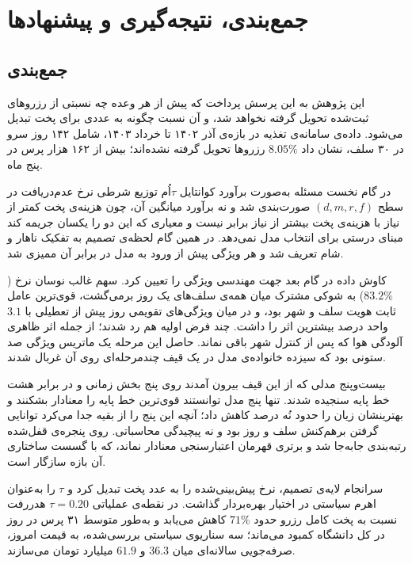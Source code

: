 \chapter{جمع‌بندی، نتیجه‌گیری و پیشنهادها}

\section{جمع‌بندی}
\label{sec:5-1}

این پژوهش به این پرسش پرداخت که پیش از هر وعده چه نسبتی از رزروهای ثبت‌شده تحویل گرفته
نخواهد شد، و آن نسبت چگونه به عددی برای پخت تبدیل می‌شود. داده‌ی سامانه‌ی تغذیه در بازه‌ی
آذر ۱۴۰۲ تا خرداد ۱۴۰۳، شامل ۱۴۲ روز سرو در ۳۰ سلف، نشان داد $8.05\%$ رزروها تحویل
گرفته نشده‌اند؛ بیش از ۱۶۲ هزار پرس در پنج ماه.

در گام نخست مسئله به‌صورت برآورد کوانتایل $\tau$اُم توزیع شرطی نرخ عدم‌دریافت در سطح
$(d,m,r,f)$ صورت‌بندی شد و نه برآورد میانگین آن، چون هزینه‌ی پخت کمتر از نیاز با هزینه‌ی
پخت بیشتر از نیاز برابر نیست و معیاری که این دو را یکسان جریمه کند مبنای درستی برای
انتخاب مدل نمی‌دهد. در همین گام لحظه‌ی تصمیم به تفکیک ناهار و شام تعریف شد و هر ویژگی
پیش از ورود به مدل در برابر آن ممیزی شد.

کاوش داده در گام بعد جهت مهندسی ویژگی را تعیین کرد. سهم غالب نوسان نرخ ($83.2\%$) به
شوکی مشترک میان همه‌ی سلف‌های یک روز برمی‌گشت، قوی‌ترین عامل ثابت هویت سلف و شهر بود، و
در میان ویژگی‌های تقویمی روز پیش از تعطیلی با $3.1$ واحد درصد بیشترین اثر را داشت. چند
فرض اولیه هم رد شدند؛ از جمله اثر ظاهری آلودگی هوا که پس از کنترل شهر باقی نماند. حاصل
این مرحله یک ماتریس ویژگی صد ستونی بود که سیزده خانواده‌ی مدل در یک قیف چندمرحله‌ای روی
آن غربال شدند.

بیست‌وپنج مدلی که از این قیف بیرون آمدند روی پنج بخش زمانی و در برابر هشت خط پایه
سنجیده شدند. تنها پنج مدل توانستند قوی‌ترین خط پایه را معنادار بشکنند و بهترینشان زیان
 را حدود نُه درصد کاهش داد؛ آنچه این پنج را از بقیه جدا می‌کرد توانایی
گرفتن برهم‌کنش سلف و روز بود و نه پیچیدگی محاسباتی. روی پنجره‌ی قفل‌شده رتبه‌بندی جابه‌جا
شد و برتری قهرمان اعتبارسنجی معنادار نماند، که با گسست ساختاری آن بازه سازگار است.

سرانجام لایه‌ی تصمیم، نرخ پیش‌بینی‌شده را به عدد پخت تبدیل کرد و $\tau$ را به‌عنوان اهرم
سیاستی در اختیار بهره‌بردار گذاشت. در نقطه‌ی عملیاتی $\tau = 0.20$ هدررفت نسبت به پخت
کامل رزرو حدود $71\%$ کاهش می‌یابد و به‌طور متوسط ۳۱ پرس در روز در کل دانشگاه کمبود
می‌ماند؛ سه سناریوی سیاستی بررسی‌شده، به قیمت امروز، صرفه‌جویی سالانه‌ای میان $36.3$ و
$61.9$ میلیارد تومان می‌سازند.

